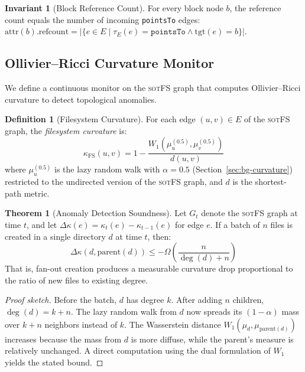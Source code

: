 \documentclass[11pt,a4paper]{article}
\theoremstyle{definition}
\newtheorem{definition}{Definition}[section]
\newtheorem{theorem}{Theorem}[section]
\newtheorem{invariant}{Invariant}[section]
\theoremstyle{remark}
\newcommand{\sotfs}{\textsc{sotFS}}
\newcommand{\OR}{\ensuremath{\kappa}}  %
\newcommand{\Wone}{\ensuremath{W_1}}
\begin{document}
\begin{invariant}[Block Reference Count]
\label{inv:block-refcount}
For every block node $b$, the reference count equals the number of
incoming \texttt{pointsTo} edges: $\mathrm{attr}(b).\mathrm{refcount}
= |\{e \in E \mid \tau_E(e) = \texttt{pointsTo} \land
\mathrm{tgt}(e) = b\}|$.
\end{invariant}

\subsection{Ollivier--Ricci Curvature Monitor}
\label{sec:sotfs-curvature}

We define a continuous monitor on the \sotfs{} graph that computes
Ollivier--Ricci curvature to detect topological anomalies.

\begin{definition}[Filesystem Curvature]
\label{def:fs-curvature}
For each edge $(u, v) \in E$ of the \sotfs{} graph, the
\emph{filesystem curvature} is:
\[
\OR_{\mathrm{FS}}(u, v) = 1 - \frac{\Wone(\mu_u^{(0.5)}, \mu_v^{(0.5)})}{d(u, v)}
\]
where $\mu_u^{(0.5)}$ is the lazy random walk with $\alpha = 0.5$
(Section~\ref{sec:bg-curvature}) restricted to the undirected version
of the \sotfs{} graph, and $d$ is the shortest-path metric.
\end{definition}

\begin{theorem}[Anomaly Detection Soundness]
\label{thm:anomaly}
Let $G_t$ denote the \sotfs{} graph at time $t$, and let
$\Delta\OR(e) = \OR_t(e) - \OR_{t-1}(e)$ for edge $e$.
If a batch of $n$ files is created in a single directory $d$ at
time $t$, then:
\[
\Delta\OR(d, \mathrm{parent}(d)) \leq -\Omega\!\left(\frac{n}{\deg(d) + n}\right)
\]
That is, fan-out creation produces a measurable curvature drop
proportional to the ratio of new files to existing degree.
\end{theorem}

\begin{proof}[Proof sketch]
Before the batch, $d$ has degree $k$. After adding $n$ children,
$\deg(d) = k + n$. The lazy random walk from $d$ now spreads its
$(1-\alpha)$ mass over $k + n$ neighbors instead of $k$. The
Wasserstein distance $\Wone(\mu_d, \mu_{\mathrm{parent}(d)})$
increases because the mass from $d$ is more diffuse, while the
parent's measure is relatively unchanged. A direct computation
using the dual formulation of $\Wone$ yields the stated bound.
\end{proof}
\end{document}
